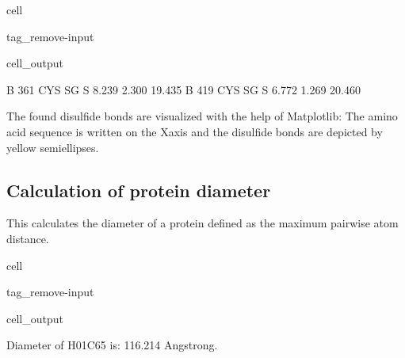 \documentclass[letterpaper,10pt,english]{jupyterBook}
\begin{document}
\begin{sphinxuseclass}{cell}
\begin{sphinxuseclass}{tag_remove-input}\begin{sphinxVerbatimOutput}

\begin{sphinxuseclass}{cell_output}
\begin{sphinxVerbatim}[commandchars=\\\{\}]
    B     361  CYS SG     S        \PYGZhy{}8.239    2.300   19.435
    B     419  CYS SG     S        \PYGZhy{}6.772    1.269   20.460
\end{sphinxVerbatim}

\noindent{}

\end{sphinxuseclass}\end{sphinxVerbatimOutput}

\end{sphinxuseclass}
\end{sphinxuseclass}
\sphinxAtStartPar
The found disulfide bonds are visualized with the help of Matplotlib: The amino acid sequence is written on the X\sphinxhyphen{}axis and the disulfide bonds are depicted by yellow semi\sphinxhyphen{}ellipses.


\subsection{Calculation of protein diameter}
\label{\detokenize{ipynb/chapter1:calculation-of-protein-diameter}}
\sphinxAtStartPar
This calculates the diameter of a protein defined as the maximum pairwise atom distance.

\begin{sphinxuseclass}{cell}
\begin{sphinxuseclass}{tag_remove-input}\begin{sphinxVerbatimOutput}

\begin{sphinxuseclass}{cell_output}
\begin{sphinxVerbatim}[commandchars=\\\{\}]
\PYGZsh{} Diameter of H\PYGZus{}01C65 is: \PYGZhy{}\PYGZhy{}\PYGZhy{}\PYGZhy{}\PYGZhy{}\PYGZhy{}\PYGZhy{}\PYGZhy{}\PYGZhy{}\PYGZhy{}\PYGZhy{}\PYGZhy{}\PYGZhy{}\PYGZhy{}\PYGZhy{}\PYGZhy{}\PYGZhy{}\PYGZhy{}\PYGZhy{}\PYGZhy{}\PYGZhy{}\PYGZhy{}\PYGZhy{}116.214 Angstrong.
\end{sphinxVerbatim}

\end{sphinxuseclass}\end{sphinxVerbatimOutput}

\end{sphinxuseclass}
\end{sphinxuseclass}
\end{document}
